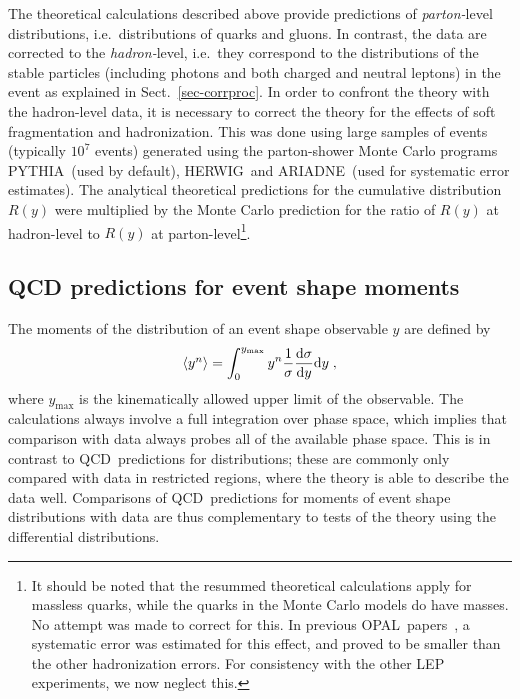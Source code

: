 \documentclass[12pt,a4paper,twoside]{article}
\newcommand{\momn}[2] {\mbox{\ensuremath{\langle#1^{#2}\rangle}}}
\newcommand{\dd}    {\ensuremath{\mathrm{d}}}
\newcommand{\Opal}{\mbox{\rm OPAL}}
\newcommand{\qcd}{\mbox{QCD}}
\newcommand{\Herwig}{\mbox{HERWIG}}
\newcommand{\Pythia}{\mbox{PYTHIA}}
\newcommand{\Ariadne}{\mbox{ARIADNE}}
\begin{document}
The theoretical calculations described above
provide predictions of {\em parton-}level distributions, i.e.\ distributions of 
quarks and gluons.  In contrast, the data are corrected to the {\em hadron-}level,
i.e.\ they correspond to the distributions of the stable particles
(including photons and both charged and neutral leptons)
in the event as explained in Sect.~\ref{sec-corrproc}.
In order to confront the
theory with the hadron-level data, it is necessary to 
correct the theory for the effects of soft fragmentation 
and hadronization.  This was done using large samples of events 
(typically $10^7$ events) generated using 
the parton-shower Monte Carlo programs \Pythia\ (used by default),
 \Herwig\ and \Ariadne\ (used for systematic error estimates).  The analytical 
theoretical predictions for the cumulative distribution $R(y)$
were multiplied by the Monte Carlo prediction for the
ratio of $R(y)$ at hadron-level to $R(y)$ at  parton-level\footnote{It should be noted that the
resummed theoretical calculations apply for massless quarks, while the quarks in 
the Monte Carlo models do have masses.  No attempt was made to correct for this.
In previous \Opal\ papers~\cite{OPALPR075,OPALPR158,OPALPR197,OPALPR303}, 
a systematic error was estimated for this effect, and proved
to be smaller than the other hadronization errors.  For consistency with the 
other LEP experiments, we now neglect this.}.

\subsection{QCD predictions for event shape moments}
\label{sec_qcdmon}
The moments of the distribution of an event shape observable $y$ are
defined by 
\begin{equation}\momn{y}{n}=\int_0^{y_{\mathrm{max}}} y^n 
\frac{1}{\sigma} \frac{\dd\sigma}{\dd y} \dd y \;,\end{equation}
where $y_{\mathrm{max}}$ is the kinematically allowed upper limit of the
observable.  The calculations always involve a full integration over
phase space, which implies that comparison with data always probes all
of the available phase space.  This is in contrast to \qcd\ predictions
for distributions; these are commonly only compared with data in
restricted regions, where the theory is able to describe the data
well.  Comparisons of \qcd\ predictions for moments of event shape
distributions with data are thus complementary to tests of the theory
using the differential distributions.
\end{document}
